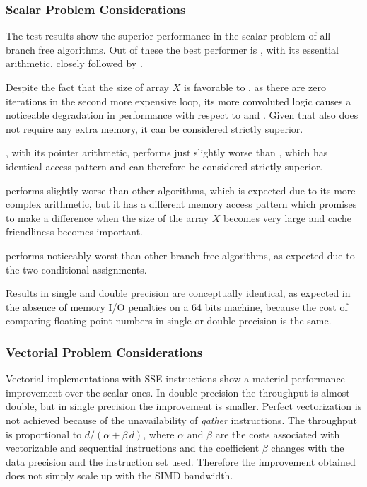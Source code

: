\documentclass[preprint,1p,times]{elsarticle}
\begin{document}
\subsubsection{Scalar Problem Considerations}

The test results show the superior performance in the scalar problem of all branch free algorithms. Out of these the best performer is \textit{\BitSetName}, with its essential arithmetic, closely followed by \textit{\ClassicOffsetName}.

Despite the fact that the size of array $X$ is favorable to \textit{\BitSetNoPadName}, as there are zero iterations in the second more expensive loop, its more convoluted logic causes a noticeable degradation in performance with respect to \textit{\BitSetName} and \textit{\ClassicOffsetName}. Given that \textit{\ClassicOffsetName} also does not require any extra memory, it can be considered strictly superior.

\textit{\MorinOffsetName}, with its pointer arithmetic, performs just slightly worse than \textit{\ClassicOffsetName}, which has identical access pattern and can therefore be considered strictly superior.

\textit{\EytzingerName} performs slightly worse than other algorithms, which is expected due to its more complex arithmetic, but it has a different memory access pattern which promises to make a difference when the size of the array $X$ becomes very large and cache friendliness becomes important.

\textit{\ClassicModName} performs noticeably worst than other branch free algorithms, as expected due to the two conditional assignments.

Results in single and double precision are conceptually identical, as expected in the absence of memory I/O penalties on a 64 bits machine, because the cost of comparing floating point numbers in single or double precision is the same.

\subsubsection{Vectorial Problem Considerations}
\label{sec:testbinvec}
Vectorial implementations with SSE instructions show a material performance improvement over the scalar ones. In double precision the throughput is almost double, but in single precision the improvement is smaller. Perfect vectorization is not achieved because of the unavailability of \textit{gather} instructions. The throughput is proportional to $d/(\alpha + \beta\,d)$, where $\alpha$ and $\beta$ are the costs associated with vectorizable and sequential instructions and the coefficient $\beta$ changes with the data precision and the instruction set used. Therefore the improvement obtained does not simply scale up with the SIMD bandwidth. 
\end{document}
